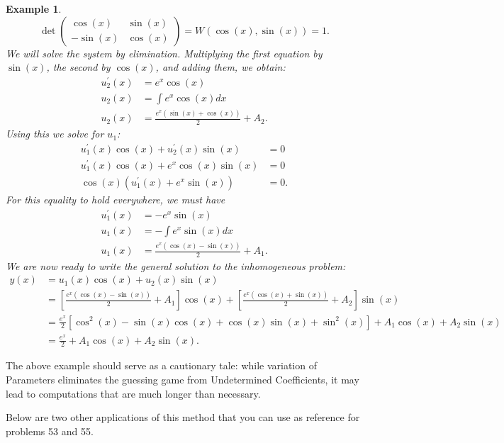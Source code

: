 \documentclass[11pt]{amsart}
\newtheorem{example}{Example}
\numberwithin{equation}{section}
\begin{document}
\begin{example}
\begin{equation*}
\det \left(
\begin{matrix}
\cos(x) & \sin(x) \\
-\sin(x) &  \cos(x) 
\end{matrix}
\right) = W(\cos(x), \sin(x)) = 1. 
\end{equation*}
We will solve the system by elimination. Multiplying the first equation by $\sin(x)$, the second by $\cos(x)$, and adding them, we obtain:
\begin{align*}
u_{2}^{'}(x) & = e^{x}\cos(x) \\
u_2(x) & = \int e^x\cos(x) dx \\
u_2(x) & =   \frac{e^{x}(\sin(x)+\cos(x))}{2}+ A_2.
\end{align*}
Using this we solve for $u_1$:
\begin{align*}
u_{1}^{'}(x)\cos(x)+u_{2}^{'}(x)\sin(x) & = 0 \\
u_{1}^{'}(x)\cos(x) + e^{x}\cos(x)\sin(x) & = 0\\
\cos(x)(u_{1}^{'}(x)+e^x\sin(x)) & =0.
\end{align*}
For this equality to hold everywhere, we must have 
\begin{align*}
u_{1}^{'}(x) & = -e^x\sin(x) \\
u_{1}(x) & = -\int e^{x}\sin(x)dx \\
u_{1}(x) & = \frac{e^{x}(\cos(x)-\sin(x))}{2} + A_1.
\end{align*}
We are now ready to write the general solution to the inhomogeneous problem:
\begin{align*}
y(x) & = u_1(x)\cos(x) + u_2(x)\sin(x) \\
& =\left[\frac{e^{x}(\cos(x)-\sin(x))}{2} + A_1\right]\cos(x) + \left[\frac{e^{x}(\cos(x)+\sin(x))}{2} + A_2\right]\sin(x)\\
& = \frac{e^x}{2}[\cos^2(x)-\sin(x)\cos(x)+\cos(x)\sin(x)+\sin^2(x)] + A_1\cos(x)+A_2\sin(x) \\
& = \frac{e^x}{2}+A_1\cos(x)+A_2\sin(x).
\end{align*}
\end{example}

The above example should serve as a cautionary tale: while variation of Parameters eliminates the guessing game from Undetermined Coefficients, it may lead to computations that are much longer than necessary.

Below are two other applications of this method that you can use as reference for problems 53 and 55. 
\end{document}
